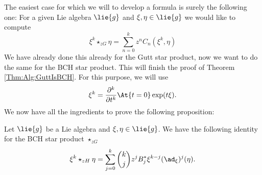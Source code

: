 The easiest case for which we will to develop a formula is surely the 
following one: For a given Lie algebra $\lie{g}$ and $\xi, \eta \in 
\lie{g}$ we would like to compute
\begin{equation*}
    \xi^k \star_{zG} \eta
    =
    \sum\limits_{n=0}^k
    z^n C_n(\xi^k, \eta)
\end{equation*}
We have already done this already for the Gutt star product, now we 
want to do the same for the BCH star product. This will finish
the proof of Theorem \ref{Thm:Alg:GuttIsBCH}. For this purpose, we will
use
\begin{equation*}
    \xi^k
    =
    \frac{\partial^k}{\partial t^k}
    \At{t = 0} \exp(t \xi).
\end{equation*}
We now have all the ingredients to prove the following proposition:
\begin{lemma}
    \label{Lemma:Formulas:LinearMonomial1}
    Let $\lie{g}$ be a Lie algebra and $\xi, \eta \in \lie{g}$. We
    have the following identity for the BCH star product $\star_{zG}$
    \begin{equation}
        \label{Formulas:LinearMonomial1}
        \xi^k \star_{zH} \eta
        =
        \sum\limits_{j=0}^k
        \binom{k}{j} z^j B_j^*
        \xi^{k-j}(\ad_{\xi})^j (\eta).
    \end{equation}
\end{lemma}
